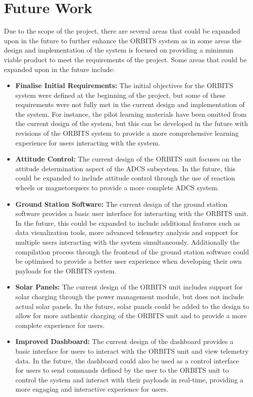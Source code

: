 \documentclass[a4paper,12pt,titlepage]{report}
\begin{document}
\newpage
\section{Future Work}

Due to the scope of the project, there are several areas that could be expanded upon in the future to further enhance the ORBITS system as in some areas the design and implementation of the system is focused on providing a minimum viable product to meet the requirements of the project. Some areas that could be expanded upon in the future include:
\begin{itemize}
    \item \textbf{Finalise Initial Requirements:} The initial objectives for the ORBITS system were defined at the beginning of the project, but some of these requirements were not fully met in the current design and implementation of the system. For instance, the pilot learning materials have been omitted from the current design of the system, but this can be developed in the future with revisions of the ORBITS system to provide a more comprehensive learning experience for users interacting with the system.
    \item \textbf{Attitude Control:} The current design of the ORBITS unit focuses on the attitude determination aspect of the ADCS subsystem. In the future, this could be expanded to include attitude control through the use of reaction wheels or magnetorquers to provide a more complete ADCS system.
    \item \textbf{Ground Station Software:} The current design of the ground station software provides a basic user interface for interacting with the ORBITS unit. In the future, this could be expanded to include additional features such as data visualization tools, more advanced telemetry analysis and support for multiple users interacting with the system simultaneously. Additionally the compilation process through the frontend of the ground station software could be optimised to provide a better user experience when developing their own payloads for the ORBITS system.
    \item \textbf{Solar Panels:} The current design of the ORBITS unit includes support for solar charging through the power management module, but does not include actual solar panels. In the future, solar panels could be added to the design to allow for more authentic charging of the ORBITS unit and to provide a more complete experience for users.
    \item \textbf{Improved Dashboard:} The current design of the dashboard provides a basic interface for users to interact with the ORBITS unit and view telemetry data. In the future, the dashboard could also be used as a control interface for users to send commands defined by the user to the ORBITS unit to control the system and interact with their payloads in real-time, providing a more engaging and interactive experience for users.

\end{itemize}
\end{document}
